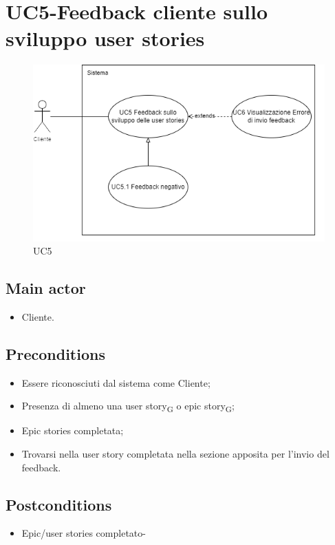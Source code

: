 \documentclass{article}
\begin{document}
\section{UC5-Feedback cliente sullo sviluppo user stories}
    \begin{figure}[h]
      \centering
      \includegraphics{./imgUML/UC5.png}
        \caption{UC5}
      \label{fig:UC5}
    \end{figure}
    
    \subsection*{Main actor}
    \begin{itemize}
        \item Cliente.
    \end{itemize}
    
    \subsection*{Preconditions}
    \begin{itemize}
        \item Essere riconosciuti dal sistema come Cliente;
        \item Presenza di almeno una user story\textsubscript{G}  o epic story\textsubscript{G};
        \item Epic stories completata;
        \item Trovarsi nella user story completata nella sezione apposita per l'invio del feedback.
    \end{itemize}
    
    \subsection*{Postconditions}
    \begin{itemize}
        \item Epic/user stories completato-
    \end{itemize}
    
\end{document}
